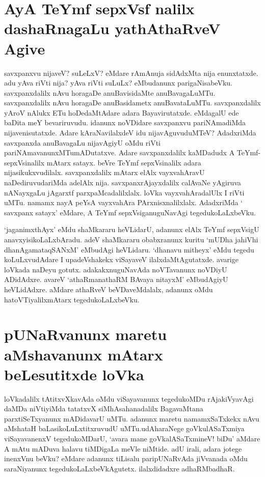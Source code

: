 \section*{AyA TeYmf sepxVsf nalilx dashaRnagaLu yathAthaRveV Agive}

savxpanxvu nijaveV? suLeLxV? eMdare rAmAnuja sidAdxMta nija enunxtatxde. adu yAva riVti nija? yAva riVti suLuLx? eMbudanunx parigaNisabeVku. savxpanxdalilx nAvu horagaDe anuBavisidaMte anuBavagaLuMTu. savxpanxdalilx nAvu horagaDe anuBasidametx anuBavataLuMTu. savxpanxdalilx yAroV nAlukx ETu hoDedaMtAdare adara Bayavirutatxde. eMdagalU ede baDita meY bevariruvudu. idanunx noVDidare savxpanxvu pariNAmadiMda nijavenisutatxde. Adare kAraNavilalxdeV idu nijavAguvuduMTeV? AdadxriMda savxpanxda anuBavagaLu nijavAgiyU oMdu riVti pariNAmavanunxMTumADutatxve. Adare savxpanxdalilx kaMDadudx A TeYmf-sepxVsinalilx mAtarx satayx. beVre TeYmf sepxVsinalilx adara nijasikukxvudilalx. savxpanxdalilx mAtarx elAlx vayxvahAravU naDediruvudariMda adelAlx nija. savxpanxrAjayxdalilx calAvaNe yAgiruva nANayxgaLu jAgarxtf parxpaMcadalilxlalx. loVka vayxvahAradalUlx I riVti uMTu. namamx nayA peYsA vayxvahAra PArxnisxnalilxlalx. AdadxriMda ` savxpanx satayx' eMdare, A TeYmf sepxVsiganuguNavAgi tegedukoLaLxbeVku.

`jaganimxthAyx' eMdu shaMkararu heVLidarU, adanunx elAlx TeYmf sepxVsigU anavxyisikoLaLxbAradu. adeV shaMkararu obabxranunx kuritu `mUDha jahiVhi dhanAgamataqSANxM'\label{55a} eMbudAgi heVLidaru. `dhanavu mitheyx' eMdu tegedu koLuLxvudAdare I upadeVshakekx viSayaveV ilalxdaMtAgutatxde. avarige loVkada naDeyu gotutx. adakakxnuguNavAda noVTavanunx noVDiyU ADidAdxre. avareV `athaRmanathaRM BAvaya nitayxM'\label{55} eMbudAgiyU heVLidAdxre. aMdare athaRveV beVDaveMdalalx, adanunx oMdu hatoVTiyalilxmAtarx tegedukoLaLxbeVku.

\section*{pUNaRvanunx maretu aMshavanunx mAtarx beLesutitxde loVka}

loVkadalilx tAtitxvXkavAda oMdu viSayavanunx tegedukoMDu rAjakiVyavAgi daMDa niVtiyiMda tatatxvX siMhAsahanadalilx BagavaMtana parxtiSeTxyanunx mADidavarU uMTu. adanunx maretu namamxSaTxkekx nAvu aMshataH baLasikoLuLxtitxruvudU uMTu.udAharaNege goVkulASaTxmiya viSayavanenxV tegedukoMDarU, `avara mane goVkalASaTxmineV! biDu' aMdare A mAtu mADuva halavu tiMDigaLa meVle niMtide. adU irali, adara jotege inenxVnu beVku? eMdare adanunx tiLisalu paripUNaRvAda jiVvanada oMdu saraNiyanunx tegedukoLaLxbeVkAgutetx. ilalxdidadxre adhaRMbadhaR.

